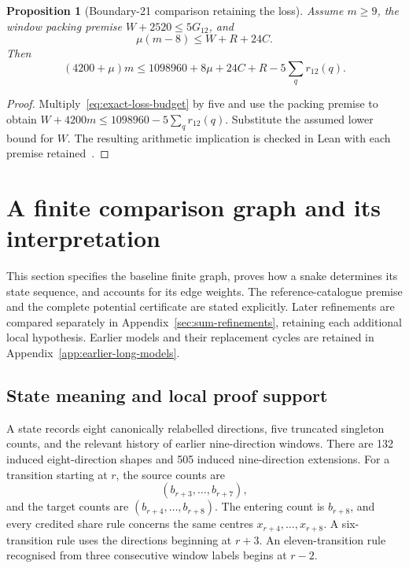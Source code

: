 \documentclass[11pt,a4paper]{article}
\newtheorem{proposition}[theorem]{Proposition}
\theoremstyle{definition}
\theoremstyle{remark}
\begin{document}
\begin{proposition}[Boundary-21 comparison retaining the loss]\label{prop:loss-potential}
Assume $m\ge9$, the window packing premise $W+2520\le5G_{12}$, and
\[
\mu(m-8)\le W+R+24C.
\]
Then
\begin{equation}\label{eq:retained-loss-potential}
(4200+\mu)m\le1098960+8\mu+24C+R-5\sum_qr_{12}(q).
\end{equation}
\end{proposition}
\begin{proof}
Multiply~\eqref{eq:exact-loss-budget} by five and use the packing premise
to obtain $W+4200m\le1098960-5\sum_qr_{12}(q)$.
Substitute the assumed lower bound for $W$. The resulting arithmetic
implication is checked in Lean with each premise retained~\cite{loss163archive}.
\end{proof}

\section{A finite comparison graph and its interpretation}\label{sec:current-model}
This section specifies the baseline finite graph, proves how a snake determines its state sequence, and accounts for its edge weights. The reference-catalogue premise and the complete potential certificate are stated explicitly. Later refinements are compared separately in Appendix~\ref{sec:sum-refinements}, retaining each additional local hypothesis. Earlier models and their replacement cycles are retained in Appendix~\ref{app:earlier-long-models}.

\subsection{State meaning and local proof support}
A state records eight canonically relabelled directions, five truncated singleton counts, and the relevant history of earlier nine-direction windows. There are 132 induced eight-direction shapes and 505 induced nine-direction extensions. For a transition starting at $r$, the source counts are
\[
(b_{r+3},\ldots,b_{r+7}),
\]
and the target counts are $(b_{r+4},\ldots,b_{r+8})$. The entering count is $b_{r+8}$, and every credited share rule concerns the same centres $x_{r+4},\ldots,x_{r+8}$. A six-transition rule uses the directions beginning at $r+3$. An eleven-transition rule recognised from three consecutive window labels begins at $r-2$.
\end{document}
